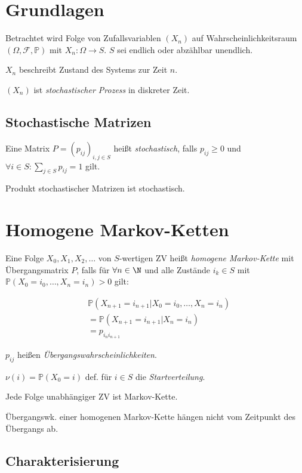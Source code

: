 \newcommand{\F}{\mathcal{F}}
\renewcommand{\P}{\mathbb{P}}

\section*{Grundlagen}

Betrachtet wird Folge von Zufallsvariablen $(X_n)$ auf Wahrscheinlichkeitsraum $(\Omega,\F,\P)$ mit $X_n : \Omega \to S$. $S$ sei endlich oder abzählbar unendlich.

$X_n$ beschreibt Zustand des Systems zur Zeit $n$.

$(X_n)$ ist \emph{stochastischer Prozess} in diskreter Zeit.

\subsection*{Stochastische Matrizen}

Eine Matrix $P = (p_{ij})_{i,j \in S}$ heißt \emph{stochastisch}, falls $p_{ij} \geq 0$ und $\forall i \in S : \sum_{j \in S} p_{ij} = 1$ gilt.

Produkt stochastischer Matrizen ist stochastisch.

\section*{Homogene Markov-Ketten}

Eine Folge $X_0, X_1, X_2, \dots$ von $S$-wertigen ZV heißt \emph{homogene Markov-Kette} mit Übergangsmatrix $P$, falls für $\forall n \in \N$ und alle Zustände $i_k \in S$ mit $\P(X_0 = i_0,\dots,X_n = i_n) > 0$ gilt:

\vspace*{-4mm}
\begin{align*}
&\P(X_{n+1} = i_{n+1} | X_0 = i_0, \dots, X_n = i_n) \\
&= \P(X_{n+1} = i_{n+1} | X_n = i_n) \\
&= p_{i_n i_{n+1}}
\end{align*}

$p_{ij}$ heißen \emph{Übergangswahrscheinlichkeiten}.

$\nu(i) = \P(X_0=i)$ def. für $i \in S$ die \emph{Startverteilung}.

\spacing

Jede Folge unabhängiger ZV ist Markov-Kette.

Übergangswk. einer homogenen Markov-Kette hängen nicht vom Zeitpunkt des Übergangs ab.

\subsection*{Charakterisierung}

